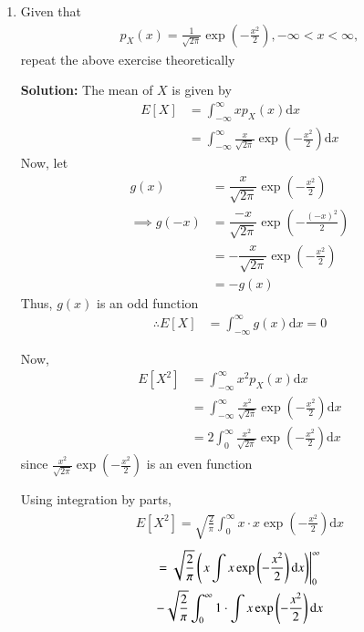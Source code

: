\documentclass[journal,12pt,twocolumn]{IEEEtran}
\newcommand{\solution}{\noindent \textbf{Solution: }}
\providecommand{\brak}[1]{\ensuremath{\left(#1\right)}}
\providecommand{\mean}[1]{E\left[ #1 \right]}
\providecommand{\der}[1]{\mathrm{d} #1}
\numberwithin{equation}{section}
\renewcommand\thesection{\arabic{section}}
\begin{document}
\begin{enumerate}[label=\thesection.\arabic*,ref=\thesection.\theenumi]
	\item Given that 
	\begin{align}
		p_{X}(x) = \frac{1}{\sqrt{2\pi}}\exp\brak{-\frac{x^2}{2}}, -\infty < x < \infty,
	\end{align}
	repeat the above exercise theoretically
	
	\solution The mean of $X$ is given by
	\begin{align}
		\mean{X} &= \int_{-\infty}^{\infty} x p_{X}(x) \mathrm{d}x \\
		&= \int_{-\infty}^{\infty} \frac{x}{\sqrt{2\pi}}\exp\brak{-\frac{x^2}{2}} \mathrm{d}x 
	\end{align}
	Now, let
	\begin{align} 
		g(x) &= \dfrac{x}{\sqrt{2\pi}}\exp\brak{-\frac{x^2}{2}} \\
		\implies g(-x) &= \dfrac{-x}{\sqrt{2\pi}}\exp\brak{-\frac{(-x)^2}{2}} \\
		&= - \dfrac{x}{\sqrt{2\pi}}\exp\brak{-\frac{x^2}{2}} \\
		&= - g(x)
	\end{align}
	Thus, $g(x)$ is an odd function 
	\begin{align}
		\therefore \mean{X} &= \int_{-\infty}^{\infty} g(x) \mathrm{d}x = 0
	\end{align}
	
	Now, 
	\begin{align}
		\mean{X^2} &= \int_{-\infty}^{\infty} x^2 p_{X}(x) \mathrm{d}x \\
		&= \int_{-\infty}^{\infty} \frac{x^2}{\sqrt{2\pi}}\exp\brak{-\frac{x^2}{2}} \mathrm{d}x \\
		&= 2 \int_{0}^{\infty} \frac{x^2}{\sqrt{2\pi}}\exp\brak{-\frac{x^2}{2}} \mathrm{d}x
	\end{align}
	since $\frac{x^2}{\sqrt{2\pi}}\exp\brak{-\frac{x^2}{2}}$ is an even function
	
	Using integration by parts,
	\begin{align}
		\mean{X^2} = \sqrt{\frac{2}{\pi}}  \int_{0}^{\infty} x \cdot x \exp\brak{-\frac{x^2}{2}} \der{x} 
	\end{align}
	\begin{multline}
		= \sqrt{\frac{2}{\pi}} \brak{\left. x \int x \exp\brak{-\frac{x^2}{2}} \der{x}}\right|_0^{\infty} \\- \sqrt{\frac{2}{\pi}}  \int_{0}^{\infty} 1 \cdot \int x \exp\brak{-\frac{x^2}{2}} \der{x}
	\end{multline}
	

\end{enumerate}
\end{document}
